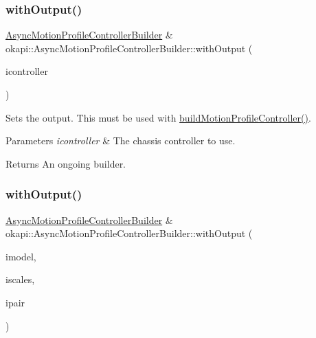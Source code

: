\subsubsection{\texorpdfstring{withOutput()}{withOutput()}\hspace{0.1cm}{\footnotesize\ttfamily [5/6]}}
{\footnotesize\ttfamily \mbox{\hyperlink{classokapi_1_1AsyncMotionProfileControllerBuilder}{Async\+Motion\+Profile\+Controller\+Builder}} \& okapi\+::\+Async\+Motion\+Profile\+Controller\+Builder\+::with\+Output (\begin{DoxyParamCaption}\item[{const std\+::shared\+\_\+ptr$<$ \mbox{\hyperlink{classokapi_1_1ChassisController}{Chassis\+Controller}} $>$ \&}]{icontroller }\end{DoxyParamCaption})}

Sets the output. This must be used with \mbox{\hyperlink{classokapi_1_1AsyncMotionProfileControllerBuilder_a2cd170fa280414c388a0106fee23638c}{build\+Motion\+Profile\+Controller()}}.


\begin{DoxyParams}{Parameters}
{\em icontroller} & The chassis controller to use. \\
\hline
\end{DoxyParams}
\begin{DoxyReturn}{Returns}
An ongoing builder. 
\end{DoxyReturn}
\mbox{\label{classokapi_1_1AsyncMotionProfileControllerBuilder_a24a0d1b349d89502300fefdad1cfd925}} 
\subsubsection{\texorpdfstring{withOutput()}{withOutput()}\hspace{0.1cm}{\footnotesize\ttfamily [6/6]}}
{\footnotesize\ttfamily \mbox{\hyperlink{classokapi_1_1AsyncMotionProfileControllerBuilder}{Async\+Motion\+Profile\+Controller\+Builder}} \& okapi\+::\+Async\+Motion\+Profile\+Controller\+Builder\+::with\+Output (\begin{DoxyParamCaption}\item[{const std\+::shared\+\_\+ptr$<$ \mbox{\hyperlink{classokapi_1_1ChassisModel}{Chassis\+Model}} $>$ \&}]{imodel,  }\item[{const \mbox{\hyperlink{classokapi_1_1ChassisScales}{Chassis\+Scales}} \&}]{iscales,  }\item[{const \mbox{\hyperlink{structokapi_1_1AbstractMotor_1_1GearsetRatioPair}{Abstract\+Motor\+::\+Gearset\+Ratio\+Pair}} \&}]{ipair }\end{DoxyParamCaption})}

